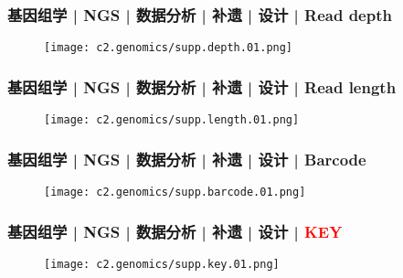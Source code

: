 \begin{frame}
  \frametitle{基因组学 | NGS | 数据分析 | 补遗 | 设计 | Read depth}
  \begin{figure}
    \centering
    \texttt{[image: c2.genomics/supp.depth.01.png]}
  \end{figure}
\end{frame}

\begin{frame}
  \frametitle{基因组学 | NGS | 数据分析 | 补遗 | 设计 | Read length}
  \begin{figure}
    \centering
    \texttt{[image: c2.genomics/supp.length.01.png]}
  \end{figure}
\end{frame}

\begin{frame}
  \frametitle{基因组学 | NGS | 数据分析 | 补遗 | 设计 | Barcode}
  \begin{figure}
    \centering
    \texttt{[image: c2.genomics/supp.barcode.01.png]}
  \end{figure}
\end{frame}

\begin{frame}
  \frametitle{基因组学 | NGS | 数据分析 | 补遗 | 设计 | \textcolor{red}{KEY}}
  \begin{figure}
    \centering
    \texttt{[image: c2.genomics/supp.key.01.png]}
  \end{figure}
\end{frame}


